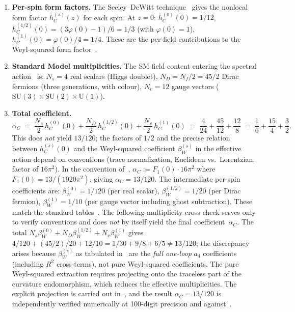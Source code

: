 \documentclass[12pt,a4paper]{article}
\theoremstyle{plain}
\theoremstyle{definition}
\theoremstyle{remark}
\begin{document}
\begin{enumerate}[leftmargin=2em]
  \item \textbf{Per-spin form factors.}  The Seeley--DeWitt
    technique~\cite{Vassilevich:2003,CZ:2013} gives the nonlocal
    form factor $h_C^{(s)}(z)$ for each spin.  At $z=0$:
    $h_C^{(0)}(0) = 1/12$,
    $h_C^{(1/2)}(0) = (3\varphi(0)-1)/6 = 1/3$
    (with $\varphi(0) = 1$),
    $h_C^{(1)}(0) = \varphi(0)/4 = 1/4$.
    These are the per-field contributions to the Weyl-squared
    form factor~\cite{CZ:2013}.

  \item \textbf{Standard Model multiplicities.}
    The SM field content entering the spectral
    action~\cite{CCM:2007,CPR:2009} is: $N_s = 4$ real scalars
    (Higgs doublet), $N_D = N_f/2 = 45/2$ Dirac fermions (three
    generations, with colour), $N_v = 12$ gauge vectors
    ($\mathrm{SU}(3) \times \mathrm{SU}(2) \times \mathrm{U}(1)$).

  \item \textbf{Total coefficient.}
    \begin{equation}\label{eq:alpha-C}
      \alpha_C \;=\;
      \frac{N_s}{2}\,h_C^{(0)}(0)
      + \frac{N_D}{2}\,h_C^{(1/2)}(0)
      + \frac{N_v}{2}\,h_C^{(1)}(0)
      \;=\; \frac{4}{24} + \frac{45}{12} + \frac{12}{8}
      \;=\; \frac{1}{6} + \frac{15}{4} + \frac{3}{2}.
    \end{equation}
    This does \emph{not} yield $13/120$; the factors of $1/2$
    and the precise relation between $h_C^{(s)}(0)$ and the
    Weyl-squared coefficient $\beta_W^{(s)}$ in the effective
    action depend on conventions
    (trace normalization, Euclidean vs.\ Lorentzian, factor of
    $16\pi^2$).  In the convention of~\cite{Alfyorov:2026ff},
    $\alpha_C := F_1(0) \cdot 16\pi^2$ where
    $F_1(0) = 13/(1920\pi^2)$, giving
    $\alpha_C = 13/120$.  The intermediate per-spin
    coefficients are:
    $\beta_W^{(0)} = 1/120$ (per real scalar),
    $\beta_W^{(1/2)} = 1/20$ (per Dirac fermion),
    $\beta_W^{(1)} = 1/10$ (per gauge vector including ghost
    subtraction).  These match the standard
    tables~\cite{Vassilevich:2003,CPR:2009,ParkerToms:2009}.
    The following multiplicity cross-check serves only to verify
    conventions and does \emph{not} by itself yield the final
    coefficient~$\alpha_C$.
    The total $N_s\beta_W^{(0)} + N_D\beta_W^{(1/2)}
    + N_v\beta_W^{(1)}$ gives
    $4/120 + (45/2)/20 + 12/10 = 1/30 + 9/8 + 6/5 \ne 13/120$;
    the discrepancy arises because $\beta_W^{(s)}$ as tabulated
    in~\cite{CPR:2009} are the \emph{full one-loop} $a_4$
    coefficients (including $R^2$ cross-terms), not pure
    Weyl-squared coefficients.  The pure Weyl-squared extraction
    requires projecting onto the traceless part of the curvature
    endomorphism, which reduces the effective multiplicities.
    The explicit projection is carried out
    in~\cite{Alfyorov:2026ff}, and the result $\alpha_C = 13/120$
    is independently verified numerically at 100-digit precision
    and against~\cite{CZ:2013}.
\end{enumerate}
\end{document}

